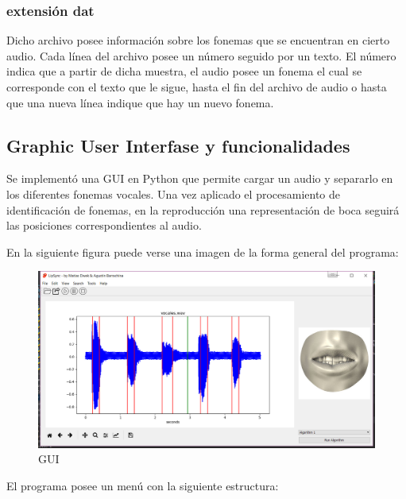 \documentclass{article}
\begin{document}
\subsubsection*{extensión dat} \label{sec:dat}

Dicho archivo posee información sobre los fonemas que se encuentran en cierto audio.
Cada línea del archivo posee un número seguido por un texto. El número indica que a partir de dicha muestra, el audio posee un fonema el cual se corresponde con el texto que le sigue, hasta el fin del archivo de audio o hasta que una nueva línea indique que hay un nuevo fonema.


\subsection*{Graphic User Interfase y funcionalidades}

Se implementó una GUI en Python que permite cargar un audio y separarlo en los diferentes fonemas vocales. Una vez aplicado el procesamiento de identificación de fonemas, en la reproducción una representación de boca seguirá las posiciones correspondientes al audio.

En la siguiente figura puede verse una imagen de la forma general del programa:

\begin{figure}[H]
	\centering
	\includegraphics[width=15cm]{programa.png}
	\caption{GUI}
	\label{fig_gui}
\end{figure}

El programa posee un menú con la siguiente estructura:
\end{document}
